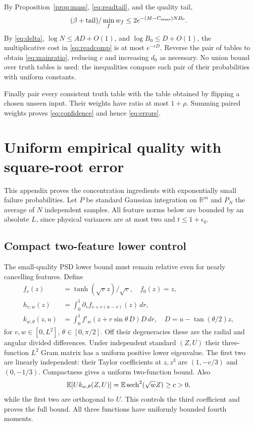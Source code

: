 \documentclass[11pt]{article}
\newcommand{\R}{\mathbb R}\newcommand{\E}{\mathbb E}\newcommand{\Pp}{\mathbb P}
\begin{document}
By Proposition~\ref{prop:mass}, \eqref{eq:readtail}, and the quality tail,
\[
 (\beta+\text{tail})/\min_f w_f\le2e^{-(M-C_{\rm mass})NB_0}.
\]
By \eqref{eq:delta}, $\log N\le AD+O(1)$, and $\log B_0\le D+O(1)$, the multiplicative cost in \eqref{eq:readcomp} is at most $e^{-cD}$. Reverse the pair of tables to obtain \eqref{eq:mainratio}, reducing $c$ and increasing $d_0$ as necessary. No union bound over truth tables is used: the inequalities compare each pair of their probabilities with uniform constants.

Finally pair every consistent truth table with the table obtained by flipping a chosen unseen input. Their weights have ratio at most $1+\rho$. Summing paired weights proves \eqref{eq:confidence} and hence \eqref{eq:errors}.

\appendix
\section{Uniform empirical quality with square-root error}\label{app:quality}
This appendix proves the concentration ingredients with exponentially small failure probabilities. Let $P$ be standard Gaussian integration on $\R^m$ and $P_N$ the average of $N$ independent samples. All feature norms below are bounded by an absolute $L$, since physical variances are at most two and $t\le1+\epsilon_0$.

\subsection{Compact two-feature lower control}
The small-quality PSD lower bound must remain relative even for nearly cancelling features. Define
\begin{align}
 f_v(z)&=\tanh(\sqrt v z)/\sqrt v,\quad f_0(z)=z,\\
 h_{v,w}(z)&=\int_0^1\partial_v f_{v+r(w-v)}(z)\,dr,\\
 k_{w,\theta}(z,u)&=\int_0^1 f'_w(z+r\sin\theta\,D)D\,dr,
 \quad D=u-\tan(\theta/2)z,
\end{align}
for $v,w\in[0,L^2]$, $\theta\in[0,\pi/2]$. Off their degeneracies these are the radial and angular divided differences. Under independent standard $(Z,U)$ their three-function $L^2$ Gram matrix has a uniform positive lower eigenvalue. The first two are linearly independent: their Taylor coefficients at $z,z^3$ are $(1,-v/3)$ and $(0,-1/3)$. Compactness gives a uniform two-function bound. Also
\[
 \E[U k_{w,\theta}(Z,U)]=\E\sech^2(\sqrt w Z)\ge c>0,
\]
while the first two are orthogonal to $U$. This controls the third coefficient and proves the full bound. All three functions have uniformly bounded fourth moments.
\end{document}
